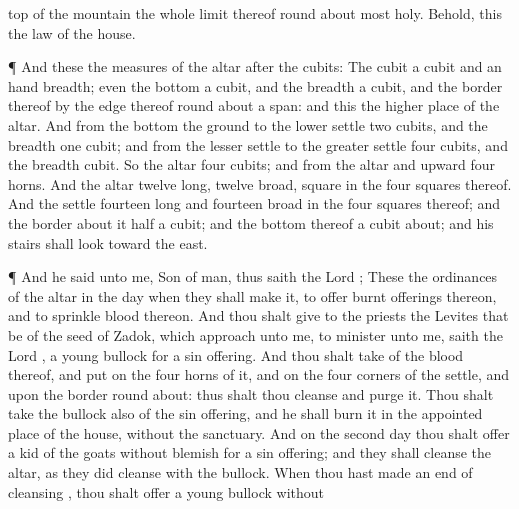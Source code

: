 {top of the
mountain the whole
limit thereof round
about
{}
most
holy. Behold, this
{} the
law of the
house.
\par }{\PP {}¶ And these
{} the
measures of the
altar after the
cubits: The
cubit
{} a
cubit and an hand
breadth; even the
bottom
{} a
cubit, and the
breadth a
cubit, and the
border thereof by the
edge thereof round
about
{}
a
span: and this
{} the higher
place of the
altar.
And from the
bottom
{} the
ground
{} to the
lower
settle
{}
two
cubits, and the
breadth
one
cubit; and from the
lesser
settle
{} to the
greater
settle
{}
four
cubits, and the
breadth
{}
cubit.
So the
altar
{}
four
cubits; and from the
altar and
upward
{}
four
horns.
And the
altar
{}
twelve
{}
long,
twelve
broad,
square in the
four
squares thereof.
And the
settle
{}
fourteen
{}
long and
fourteen
broad in the
four
squares thereof; and the
border
about it
{}
half a
cubit; and the
bottom thereof
{} a
cubit
about; and his
stairs shall
look toward the
east.
\par }{\PP {}¶ And he
said unto me,
Son of
man, thus
saith the
Lord
{}; These
{} the
ordinances of the
altar in the
day when they shall
make it, to
offer burnt
offerings thereon, and to
sprinkle
blood thereon.
And thou shalt
give to the
priests the
Levites that be of the
seed of
Zadok, which
approach unto me, to
minister unto me,
saith the
Lord
{}, a
young
bullock for a sin
offering.
And thou shalt
take of the
blood thereof, and
put
{} on the
four
horns of it, and on the
four
corners of the
settle, and upon the
border round
about: thus shalt thou
cleanse and
purge it.
Thou shalt
take the
bullock also of the sin
offering, and he shall
burn it in the appointed
place of the
house,
without the
sanctuary.
And on the
second
day thou shalt
offer a
kid of the
goats without
blemish for a sin
offering; and they shall
cleanse the
altar, as they did
cleanse
{} with the
bullock.
When thou hast made an
end of
cleansing
{}, thou shalt
offer a
young
bullock without
}
